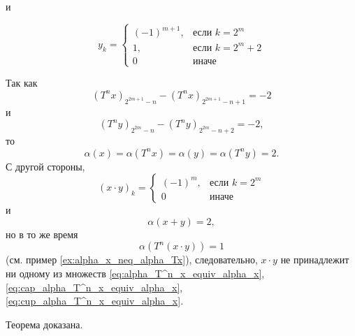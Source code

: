и

\begin{equation}
	y_k = \begin{cases}
		(-1)^{m+1},  & \mbox{если } k = 2^m     \\
		1,                   & \mbox{если } k = 2^m + 2 \\
		0                    & \mbox{иначе }
	\end{cases}
\end{equation}

Так как
\begin{equation}
	(T^n x)_{2^{2m+1}-n} - (T^n x)_{2^{2m+1}-n+1} = -2
\end{equation}
и
\begin{equation}
	(T^n y)_{2^{2m}-n} - (T^n y)_{2^{2m}-n+2} = -2
	,
\end{equation}
то
\begin{equation}
	\alpha(x) = \alpha(T^n x) = \alpha(y) = \alpha(T^n y) = 2
	.
\end{equation}
С другой стороны,
\begin{equation}
	(x\cdot y)_k = \begin{cases}
		(-1)^m,  & \mbox{если } k = 2^m     \\
		0        & \mbox{иначе }
	\end{cases}
\end{equation}
и
\begin{equation}
	\alpha(x+y) = 2
	,
\end{equation}
но в то же время
\begin{equation}
	\alpha(T^n(x \cdot y)) = 1
\end{equation}
(см. пример \ref{ex:alpha_x_neq_alpha_Tx}),
следовательно, $x \cdot y$ не принадлежит ни одному из множеств
\eqref{eq:alpha_T^n_x_equiv_alpha_x}, \eqref{eq:cap_alpha_T^n_x_equiv_alpha_x}, \eqref{eq:cup_alpha_T^n_x_equiv_alpha_x}.

Теорема доказана.




